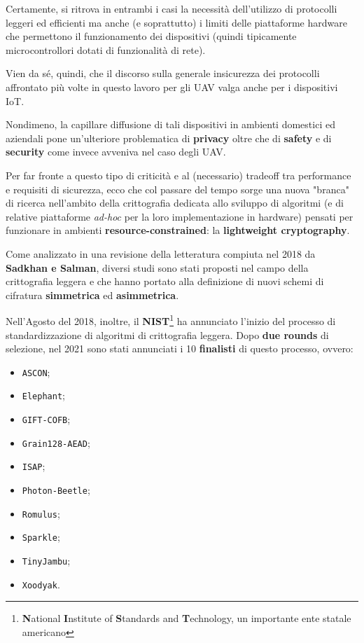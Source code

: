\documentclass[a4paper, 12pt, oneside]{article}
\theoremstyle{definition}
\begin{document}
Certamente, si ritrova in entrambi i casi la necessità dell'utilizzo di protocolli leggeri ed efficienti ma anche (e soprattutto) i limiti delle piattaforme hardware che permettono il funzionamento dei dispositivi (quindi tipicamente microcontrollori dotati di funzionalità di rete). 

Vien da sé, quindi, che il discorso sulla generale insicurezza dei protocolli affrontato più volte in questo lavoro per gli UAV valga anche per i dispositivi IoT. 

Nondimeno, la capillare diffusione di tali dispositivi in ambienti domestici ed aziendali pone un'ulteriore problematica di \textbf{privacy} oltre che di \textbf{safety} e di \textbf{security} come invece avveniva nel caso degli UAV.

Per far fronte a questo tipo di criticità e al (necessario) tradeoff tra performance e requisiti di sicurezza, ecco che col passare del tempo sorge una nuova "branca" di ricerca nell'ambito della crittografia dedicata allo sviluppo di algoritmi (e di relative piattaforme \textit{ad-hoc} per la loro implementazione in hardware) pensati per funzionare in ambienti \textbf{resource-constrained}: la \textbf{lightweight cryptography}.

Come analizzato in una revisione della letteratura \cite{8370965} compiuta nel 2018 da \textbf{Sadkhan e Salman}, diversi studi sono stati proposti nel campo della crittografia leggera e che hanno portato alla definizione di nuovi schemi di cifratura \textbf{simmetrica} ed \textbf{asimmetrica}.

Nell'Agosto del 2018, inoltre, il \textbf{NIST}\footnote{\textbf{N}ational \textbf{I}nstitute of \textbf{S}tandards and \textbf{T}echnology, un importante ente statale americano} ha annunciato l'inizio del processo di standardizzazione \cite{nist-request-lwc} di algoritmi di crittografia leggera. Dopo \textbf{due rounds} di selezione, nel 2021 sono stati annunciati i 10 \textbf{finalisti} \cite{nist-finalists-lwc} di questo processo, ovvero:

\begin{itemize}
    \item \texttt{ASCON};
    \item \texttt{Elephant};
    \item \texttt{GIFT-COFB};
    \item \texttt{Grain128-AEAD};
    \item \texttt{ISAP};
    \item \texttt{Photon-Beetle};
    \item \texttt{Romulus};
    \item \texttt{Sparkle};
    \item \texttt{TinyJambu};
    \item \texttt{Xoodyak}.
\end{itemize}
\end{document}
